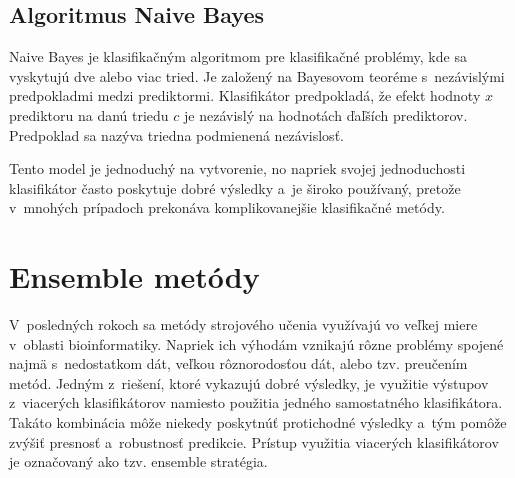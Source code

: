 \section{Algoritmus Naive Bayes}

Naive Bayes je klasifikačným algoritmom pre klasifikačné problémy, kde sa vyskytujú dve alebo viac tried. Je založený na Bayesovom teoréme s~nezávislými predpokladmi medzi prediktormi. Klasifikátor predpokladá, že efekt hodnoty $x$ prediktoru na danú triedu $c$ je nezávislý na hodnotách ďaľších prediktorov. Predpoklad sa nazýva triedna podmienená nezávislosť. 

Tento model je jednoduchý na vytvorenie, no napriek svojej jednoduchosti klasifikátor často poskytuje dobré výsledky a~je široko používaný, pretože v~mnohých prípadoch prekonáva komplikovanejšie klasifikačné metódy.

\chapter{Ensemble metódy}

V~posledných rokoch sa metódy strojového učenia využívajú vo veľkej miere v~oblasti bioinformatiky. Napriek ich výhodám vznikajú rôzne problémy spojené najmä s~nedostatkom dát, veľkou rôznorodosťou dát, alebo tzv. preučením metód. Jedným z~riešení, ktoré vykazujú dobré výsledky, je využitie výstupov z~viacerých klasifikátorov namiesto použitia jedného samostatného klasifikátora. Takáto kombinácia môže niekedy poskytnúť protichodné výsledky a~tým pomôže zvýšiť presnosť a~robustnosť predikcie. Prístup využitia viacerých klasifikátorov je označovaný ako tzv. ensemble stratégia.

